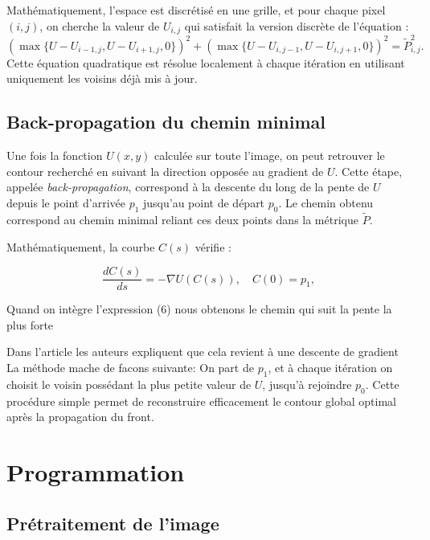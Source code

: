 \documentclass{article}
\begin{document}
Mathématiquement, l'espace est discrétisé en une grille, et pour chaque pixel $(i,j)$,
on cherche la valeur de $U_{i,j}$ qui satisfait la version discrète de l'équation :
\begin{equation}
(\max\{U - U_{i-1,j}, U - U_{i+1,j}, 0\})^2 + 
(\max\{U - U_{i,j-1}, U - U_{i,j+1}, 0\})^2 = \tilde{P}_{i,j}^2.
\end{equation}
Cette équation quadratique est résolue localement à chaque itération
en utilisant uniquement les voisins déjà mis à jour.

\subsection{Back-propagation du chemin minimal}


Une fois la fonction $U(x,y)$ calculée sur toute l'image, 
on peut retrouver le contour recherché en suivant la direction opposée au gradient de $U$.
Cette étape, appelée \textit{back-propagation}, correspond à la descente du long de la pente de $U$
depuis le point d'arrivée $p_1$ jusqu'au point de départ $p_0$.
Le chemin obtenu correspond au chemin minimal reliant ces deux points 
dans la métrique $\tilde{P}$.

Mathématiquement, la courbe $C(s)$ vérifie :

\begin{equation}
\frac{dC(s)}{ds} = -\nabla U(C(s)), \quad C(0) = p_1,
\end{equation}

Quand on intègre l'expression (6) nous obtenons le chemin qui suit la pente la plus forte

Dans l'article les auteurs expliquent que cela revient à une descente de gradient
La méthode mache de facons suivante: On part de  $p_1$, et à chaque itération on choisit
le voisin possédant la plus petite valeur de $U$, jusqu'à rejoindre $p_0$.
Cette procédure simple permet de reconstruire efficacement le contour global optimal
après la propagation du front.







\section{Programmation}
\subsection{Prétraitement de l'image}
\end{document}
